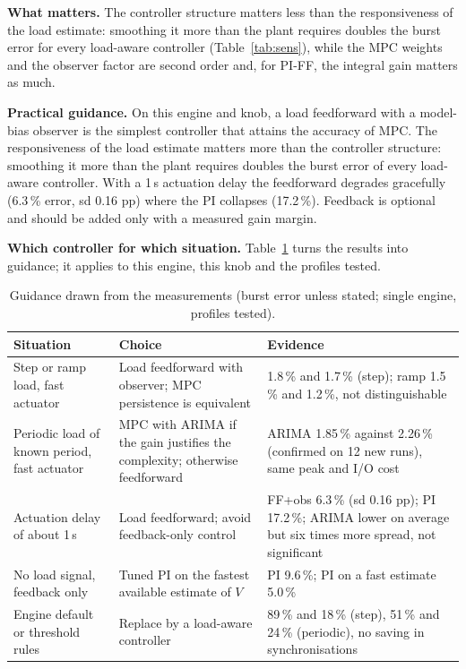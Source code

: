 \documentclass[journal]{IEEEtran}
\begin{document}
\textbf{What matters.} The controller structure matters less than the responsiveness of the load estimate: smoothing it more than the plant requires doubles the burst error for every load-aware controller (Table~\ref{tab:sens}), while the MPC weights and the observer factor are second order and, for PI-FF, the integral gain matters as much.

\textbf{Practical guidance.} On this engine and knob, a load feedforward with a model-bias observer is the simplest controller that attains the accuracy of MPC. The responsiveness of the load estimate matters more than the controller structure: smoothing it more than the plant requires doubles the burst error of every load-aware controller. With a 1\,s actuation delay the feedforward degrades gracefully (6.3\,\% error, sd 0.16 pp) where the PI collapses (17.2\,\%). Feedback is optional and should be added only with a measured gain margin.

\textbf{Which controller for which situation.} Table~\ref{tab:guide} turns the results into guidance; it applies to this engine, this knob and the profiles tested.
\begin{table}[t]\centering\footnotesize
\caption{Guidance drawn from the measurements (burst error unless stated; single engine, profiles tested).}\label{tab:guide}
\begin{tabular}{p{}p{}p{}}\toprule
Situation & Choice & Evidence\\\midrule
Step or ramp load, fast actuator & Load feedforward with observer; MPC persistence is equivalent & 1.8\,\% and 1.7\,\% (step); ramp 1.5\,\% and 1.2\,\%, not distinguishable\\
Periodic load of known period, fast actuator & MPC with ARIMA if the gain justifies the complexity; otherwise feedforward & ARIMA 1.85\,\% against 2.26\,\% (confirmed on 12 new runs), same peak and I/O cost\\
Actuation delay of about 1\,s & Load feedforward; avoid feedback-only control & FF+obs 6.3\,\% (sd 0.16 pp); PI 17.2\,\%; ARIMA lower on average but six times more spread, not significant\\
No load signal, feedback only & Tuned PI on the fastest available estimate of $V$ & PI 9.6\,\%; PI on a fast estimate 5.0\,\%\\
Engine default or threshold rules & Replace by a load-aware controller & 89\,\% and 18\,\% (step), 51\,\% and 24\,\% (periodic), no saving in synchronisations\\
\bottomrule\end{tabular}\end{table}
\end{document}
